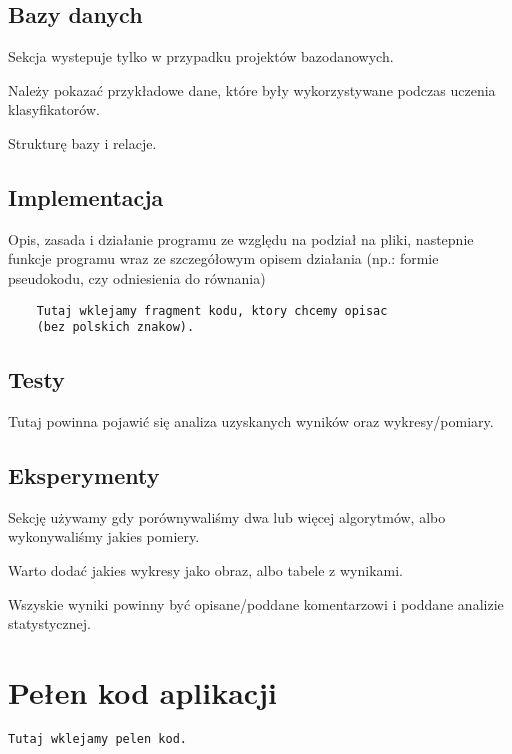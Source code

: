\documentclass[12pt,a4paper]{article}
\begin{document}
	\subsection*{Bazy danych}
	Sekcja wystepuje tylko w przypadku projektów bazodanowych.
	
	Należy pokazać przykładowe dane, które były wykorzystywane podczas uczenia klasyfikatorów.
	
	Strukturę bazy i relacje.
	\subsection*{Implementacja}
	Opis, zasada i działanie programu ze względu na podział na pliki, nastepnie	funkcje programu wraz ze szczegółowym opisem działania (np.: formie pseudokodu, czy odniesienia do równania)
	\begin{lstlisting}
	Tutaj wklejamy fragment kodu, ktory chcemy opisac 
	(bez polskich znakow).
	\end{lstlisting}
	\subsection*{Testy}
	Tutaj powinna pojawić się analiza uzyskanych wyników oraz wykresy/pomiary.
	
	\subsection*{Eksperymenty}
	Sekcję używamy gdy porównywaliśmy dwa lub więcej algorytmów, albo wykonywaliśmy jakies pomiery.
	
	Warto dodać jakies wykresy jako obraz, albo tabele z wynikami. 
	
	Wszyskie wyniki powinny być opisane/poddane komentarzowi i poddane analizie statystycznej.
	\newpage
	\section*{Pełen kod aplikacji}
\begin{lstlisting}
Tutaj wklejamy pelen kod. 
\end{lstlisting}
\end{document}
